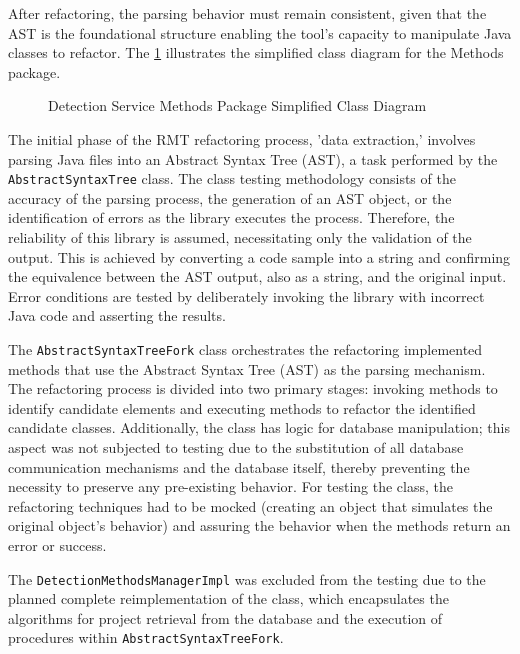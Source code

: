 After refactoring, the parsing behavior must remain consistent, given that the AST is the foundational structure enabling the tool's capacity to manipulate Java classes to refactor. The \cref{fig-class-detection-methods} illustrates the simplified class diagram for the Methods package.

\begin{figure}[ht!]
\SetCaptionWidth{\textwidth}
\caption{Detection Service Methods Package Simplified Class Diagram}
\label{fig-class-detection-methods}
\fontsize{7}{8}\selectfont

\end{figure}
\FloatBarrier

The initial phase of the RMT refactoring process, 'data extraction,' involves parsing Java files into an Abstract Syntax Tree (AST), a task performed by the \texttt{AbstractSyntaxTree} class. The class testing methodology consists of the accuracy of the parsing process, the generation of an AST object, or the identification of errors as the library \cite{javaparser} executes the process. Therefore, the reliability of this library is assumed, necessitating only the validation of the output. This is achieved by converting a code sample into a string and confirming the equivalence between the AST output, also as a string, and the original input. Error conditions are tested by deliberately invoking the library with incorrect Java code and asserting the results.

The \texttt{AbstractSyntaxTreeFork} class orchestrates the refactoring implemented methods that use the Abstract Syntax Tree (AST) as the parsing mechanism. The refactoring process is divided into two primary stages: invoking methods to identify candidate elements and executing methods to refactor the identified candidate classes. Additionally, the class has logic for database manipulation; this aspect was not subjected to testing due to the substitution of all database communication mechanisms and the database itself, thereby preventing the necessity to preserve any pre-existing behavior. For testing the class, the refactoring techniques had to be mocked (creating an object that simulates the original object's behavior) and assuring the behavior when the methods return an error or success.

The \texttt{DetectionMethodsManagerImpl} was excluded from the testing due to the planned complete reimplementation of the class, which encapsulates the algorithms for project retrieval from the database and the execution of procedures within \texttt{AbstractSyntaxTreeFork}.

